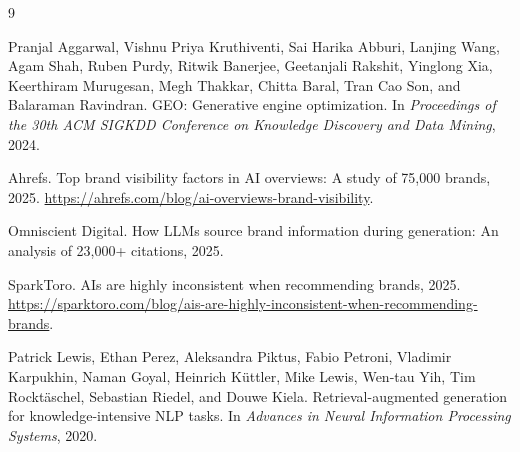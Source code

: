 \documentclass{article}
\begin{document}

\begin{thebibliography}{9}

Pranjal Aggarwal, Vishnu Priya Kruthiventi, Sai Harika Abburi, Lanjing Wang, Agam Shah, Ruben Purdy, Ritwik Banerjee, Geetanjali Rakshit, Yinglong Xia, Keerthiram Murugesan, Megh Thakkar, Chitta Baral, Tran Cao Son, and Balaraman Ravindran.
\newblock GEO: Generative engine optimization.
\newblock In \emph{Proceedings of the 30th ACM SIGKDD Conference on Knowledge Discovery and Data Mining}, 2024.

Ahrefs.
\newblock Top brand visibility factors in AI overviews: A study of 75,000 brands, 2025.
\newblock \url{https://ahrefs.com/blog/ai-overviews-brand-visibility}.

Omniscient Digital.
\newblock How LLMs source brand information during generation: An analysis of 23,000+ citations, 2025.

SparkToro.
\newblock AIs are highly inconsistent when recommending brands, 2025.
\newblock \url{https://sparktoro.com/blog/ais-are-highly-inconsistent-when-recommending-brands}.

Patrick Lewis, Ethan Perez, Aleksandra Piktus, Fabio Petroni, Vladimir Karpukhin, Naman Goyal, Heinrich Küttler, Mike Lewis, Wen-tau Yih, Tim Rocktäschel, Sebastian Riedel, and Douwe Kiela.
\newblock Retrieval-augmented generation for knowledge-intensive NLP tasks.
\newblock In \emph{Advances in Neural Information Processing Systems}, 2020.

\end{thebibliography}
\end{document}
